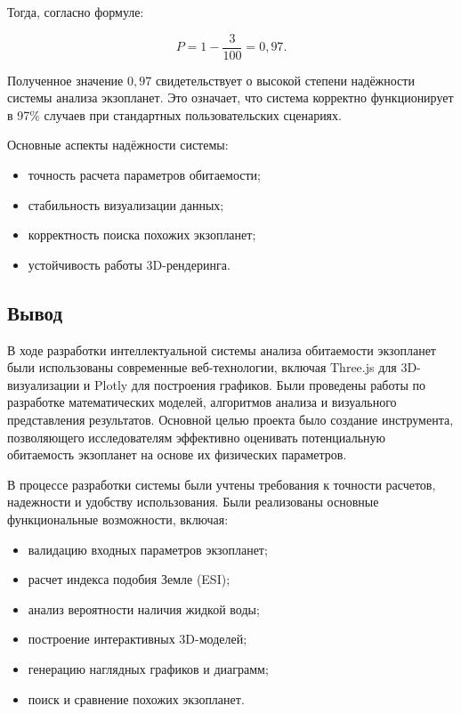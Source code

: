 Тогда, согласно формуле:

\begin{equation}
\label{eq:reliability-result}
P = 1 - \frac{3}{100} = 0{,}97.
\end{equation}

Полученное значение $0{,}97$ свидетельствует о высокой степени надёжности системы анализа экзопланет. Это означает, что система корректно функционирует в 97\% случаев при стандартных пользовательских сценариях.

Основные аспекты надёжности системы:
\begin{itemize}
    \item точность расчета параметров обитаемости;
    \item стабильность визуализации данных;
    \item корректность поиска похожих экзопланет;
    \item устойчивость работы 3D-рендеринга.
\end{itemize}

\subsection{Вывод}

В ходе разработки интеллектуальной системы анализа обитаемости экзопланет были использованы современные веб-технологии, включая Three.js для 3D-визуализации и Plotly для построения графиков. Были проведены работы по разработке математических моделей, алгоритмов анализа и визуального представления результатов. Основной целью проекта было создание инструмента, позволяющего исследователям эффективно оценивать потенциальную обитаемость экзопланет на основе их физических параметров.

В процессе разработки системы были учтены требования к точности расчетов, надежности и удобству использования. Были реализованы основные функциональные возможности, включая:
\begin{itemize}
    \item валидацию входных параметров экзопланет;
    \item расчет индекса подобия Земле (ESI);
    \item анализ вероятности наличия жидкой воды;
    \item построение интерактивных 3D-моделей;
    \item генерацию наглядных графиков и диаграмм;
    \item поиск и сравнение похожих экзопланет.
\end{itemize} 